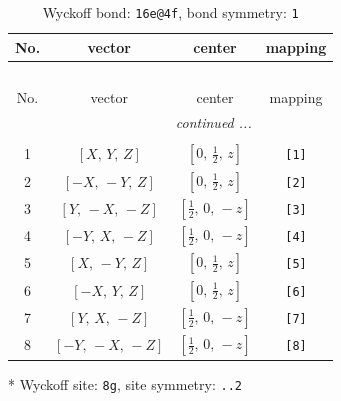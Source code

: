 \documentclass[fleqn,8pt]{jsarticle}
\begin{document}
\begin{longtable}{cccc}
\caption{Wyckoff bond: {\tt 16e@4f}, bond symmetry: {\tt 1}}
 \\
 \hline \hline
No. & vector & center & mapping \\ \hline \endfirsthead

\multicolumn{3}{l}{\tablename\ \thetable{}} \\
 \hline \hline
No. & vector & center & mapping \\ \hline \endhead

 \hline \hline
\multicolumn{3}{r}{\footnotesize\it continued ...} \\ \endfoot

 \hline \hline
\multicolumn{3}{r}{} \\ \endlastfoot

1 & $\left[ X,\, Y,\, Z \right]$ & $\left[ 0,\, \frac{1}{2},\, z \right]$ & {\tt [1]} \\ \hline
2 & $\left[ - X,\, - Y,\, Z \right]$ & $\left[ 0,\, \frac{1}{2},\, z \right]$ & {\tt [2]} \\ \hline
3 & $\left[ Y,\, - X,\, - Z \right]$ & $\left[ \frac{1}{2},\, 0,\, - z \right]$ & {\tt [3]} \\ \hline
4 & $\left[ - Y,\, X,\, - Z \right]$ & $\left[ \frac{1}{2},\, 0,\, - z \right]$ & {\tt [4]} \\ \hline
5 & $\left[ X,\, - Y,\, Z \right]$ & $\left[ 0,\, \frac{1}{2},\, z \right]$ & {\tt [5]} \\ \hline
6 & $\left[ - X,\, Y,\, Z \right]$ & $\left[ 0,\, \frac{1}{2},\, z \right]$ & {\tt [6]} \\ \hline
7 & $\left[ Y,\, X,\, - Z \right]$ & $\left[ \frac{1}{2},\, 0,\, - z \right]$ & {\tt [7]} \\ \hline
8 & $\left[ - Y,\, - X,\, - Z \right]$ & $\left[ \frac{1}{2},\, 0,\, - z \right]$ & {\tt [8]} \\
\end{longtable}
* Wyckoff site: {\tt 8g}, site symmetry: {\tt ..2}
\renewcommand{\arraystretch}{1.2}
\end{document}
